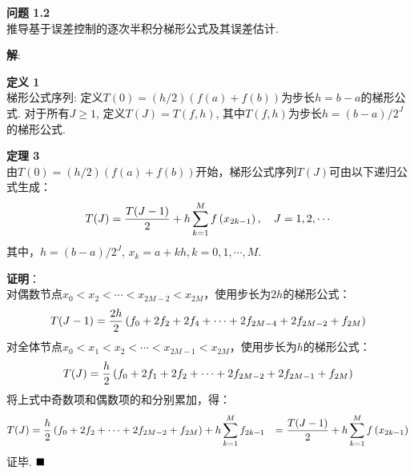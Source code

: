 \documentclass[UTF8]{ctexart}
\newenvironment{problem}[2][问题]
{\begin{mdframed}[backgroundcolor=gray!20] \textbf{#1 #2} \\}
	{\end{mdframed}}
\newenvironment{dingyi}[2][定义]
{\begin{mdframed}[backgroundcolor=gray!20] \textbf{#1 #2} \\}
	{\end{mdframed}}
\newenvironment{dingli}[2][定理]
{\begin{mdframed}[backgroundcolor=gray!20] \textbf{#1 #2} \\}
	{\end{mdframed}}
\begin{document}
\begin{problem}{1.2}
	推导基于误差控制的逐次半积分梯形公式及其误差估计.
\end{problem}
\textbf{解}:\\
\begin{dingyi}{1}
	梯形公式序列: 定义$T(0)=(h/2)(f(a)+f(b))$为步长$h=b-a$的梯形公式. 对于所有$J≥1$, 定义$T(J) = T(f,h)$, 其中$T(f,h)$为步长$h=(b-a)/2^{J}$的梯形公式.
\end{dingyi}
\begin{dingli}{3}
	由$T(0)=(h/2)(f(a)+f(b))$开始，梯形公式序列${T(J)}$可由以下递归公式生成：
	\begin{align}
		T(J)=\frac{T(J-1)}{2}+h \sum_{k=1}^{M} f\left(x_{2 k-1}\right), \quad J=1,2, \cdots \notag
	\end{align}
	其中，$h=(b-a)/2^{J}$, $x_k = a + kh, k=0,1,\cdots,M$.
\end{dingli}
\textbf{证明}：\\
对偶数节点$x_{0} < x_{2} < \cdots < x_{2M-2} < x_{2M}$，使用步长为$2h$的梯形公式：
\begin{align}
	T(J-1)=\frac{2 h}{2}\left(f_{0}+2 f_{2}+2 f_{4}+\cdots+2 f_{2 M-4}+2 f_{2 M-2}+f_{2 M}\right) \notag
\end{align}
对全体节点$x_{0} < x_{1} < x_{2} < \cdots < x_{2M-1} < x_{2M}$，使用步长为$h$的梯形公式：
\begin{align}
	T(J)=\frac{h}{2}\left(f_{0}+2 f_{1}+2 f_{2}+\cdots+2 f_{2 M-2}+2 f_{2 M-1}+f_{2 M}\right) \notag
\end{align}
将上式中奇数项和偶数项的和分别累加，得：
\begin{align}
	\begin{aligned}
		T(J) &=\frac{h}{2}\left(f_{0}+2 f_{2}+\cdots+2 f_{2 M-2}+f_{2 M}\right) + h \sum_{k=1}^{M} f_{2k-1} &= \frac{T(J-1)}{2}+h \sum_{k=1}^{M} f\left(x_{2 k-1}\right)
	\end{aligned} \notag
\end{align}
证毕. $\hfill\blacksquare$
\end{document}
